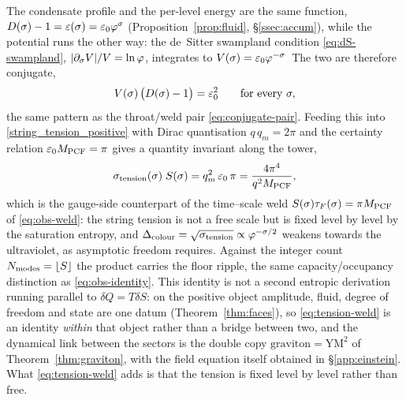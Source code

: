 \begin{proposition}\label{prop:tension-weld}
The condensate profile and the per-level energy are the same function,
$D(\sigma)-1=\varepsilon(\sigma)=\varepsilon_{0}\varphi^{\sigma}$ (Proposition~\ref{prop:fluid},
\S\ref{ssec:accum}), while the potential runs the other way: the de~Sitter swampland condition
\eqref{eq:dS-swampland}, $|\partial_\sigma V|/V=\ln\varphi$, integrates to
$V(\sigma)=\varepsilon_{0}\varphi^{-\sigma}$\,
The two are therefore conjugate,
\begin{equation}\label{eq:condensate-conjugate}
  V(\sigma)\,\big(D(\sigma)-1\big)=\varepsilon_{0}^{2}\qquad\text{for every }\sigma ,
\end{equation}
the same pattern as the throat/weld pair \eqref{eq:conjugate-pair}. Feeding this into
\eqref{string_tension_positive} with Dirac quantisation $q\,q_m=2\pi$ and the certainty relation
$\varepsilon_{0}M_{\mathrm{PCF}}=\pi$ gives a quantity invariant along the tower,
\begin{equation}\label{eq:tension-weld}
  \sigma_{\mathrm{tension}}(\sigma)\;S(\sigma)=q_m^{2}\,\varepsilon_{0}\,\pi=\frac{4\pi^{4}}{q^{2}M_{\mathrm{PCF}}},
\end{equation}
which is the gauge-side counterpart of the time--scale weld $S(\sigma)\tau_F(\sigma)=\pi M_{\mathrm{PCF}}$ of
\eqref{eq:obs-weld}: the string tension is not a free scale but is fixed level by level by the
saturation entropy, and $\Delta_{\mathrm{colour}}=\sqrt{\sigma_{\mathrm{tension}}}\propto\varphi^{-\sigma/2}$
weakens towards the ultraviolet, as asymptotic freedom requires. Against the integer count
$N_{\mathrm{modes}}=\lfloor S\rfloor$ the product carries the floor ripple, the same capacity/occupancy
distinction as \eqref{eq:obs-identity}. This identity is not a second entropic derivation running
parallel to $\delta Q=T\delta S$: on the positive object amplitude, fluid, degree of freedom and
state are one datum (Theorem~\ref{thm:faces}), so \eqref{eq:tension-weld} is an identity \emph{within}
that object rather than a bridge between two, and the dynamical link between the sectors is the
double copy $\text{graviton}=\mathrm{YM}^{2}$ of Theorem~\ref{thm:graviton}, with the field equation
itself obtained in \S\ref{app:einstein}. What \eqref{eq:tension-weld} adds is that the tension is
fixed level by level rather than free.

\end{proposition}

